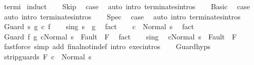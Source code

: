 \begin{isabellebody}
%
\isadelimproof
%
\endisadelimproof
%
\isatagproof
{}\isamarkupfalse%
\ termi\isanewline
{}\isamarkupfalse%
\ {\isacharparenleft}induct{\isacharparenright}\isanewline
\ \ \isamarkupfalse%
\ Skip\ \isamarkupfalse%
\ {\isacharquery}case\ \isamarkupfalse%
\ {\isacharparenleft}auto\ intro{\isacharcolon}\ terminates{\isachardot}intros{\isacharparenright}\isanewline
{}\isamarkupfalse%
\isanewline
\ \ \isamarkupfalse%
\ Basic\ \isamarkupfalse%
\ {\isacharquery}case\ \isamarkupfalse%
\ {\isacharparenleft}auto\ intro{\isacharcolon}\ terminates{\isachardot}intros{\isacharparenright}\isanewline
{}\isamarkupfalse%
\isanewline
\ \ \isamarkupfalse%
\ Spec\ \isamarkupfalse%
\ {\isacharquery}case\ \isamarkupfalse%
\ {\isacharparenleft}auto\ intro{\isacharcolon}\ terminates{\isachardot}intros{\isacharparenright}\isanewline
{}\isamarkupfalse%
\isanewline
\ \ \isamarkupfalse%
\ {\isacharparenleft}Guard\ s\ g\ c\ f{\isacharparenright}\isanewline
\ \ \isamarkupfalse%
\ s{\isacharunderscore}in{\isacharunderscore}g{\isacharcolon}\ {\isachardoublequoteopen}s\ {\isasymin}\ g{\isachardoublequoteclose}\ \isamarkupfalse%
\ fact\isanewline
\ \ \isamarkupfalse%
\ {\isachardoublequoteopen}{\isasymGamma}{\isasymturnstile}c\ {\isasymdown}\ Normal\ s{\isachardoublequoteclose}\ \isamarkupfalse%
\ fact\isanewline
\ \ \isamarkupfalse%
\ {\isachardoublequoteopen}{\isasymGamma}{\isasymturnstile}{\isasymlangle}Guard\ f\ g\ c{\isacharcomma}Normal\ s\ {\isasymrangle}\ {\isasymRightarrow}{\isasymnotin}Fault\ {\isacharbackquote}\ F{\isachardoublequoteclose}\ \isamarkupfalse%
\ fact\isanewline
\ \ \isamarkupfalse%
\ s{\isacharunderscore}in{\isacharunderscore}g\ \isamarkupfalse%
\ {\isachardoublequoteopen}{\isasymGamma}{\isasymturnstile}{\isasymlangle}c{\isacharcomma}Normal\ s\ {\isasymrangle}\ {\isasymRightarrow}{\isasymnotin}Fault\ {\isacharbackquote}\ F{\isachardoublequoteclose}\isanewline
\ \ \ \ \isamarkupfalse%
\ {\isacharparenleft}fastforce\ simp\ add{\isacharcolon}\ final{\isacharunderscore}notin{\isacharunderscore}def\ intro{\isacharcolon}\ exec{\isachardot}intros{\isacharparenright}\isanewline
\ \ \isamarkupfalse%
\ Guard{\isachardot}hyps\ \isamarkupfalse%
\ {\isachardoublequoteopen}{\isasymGamma}{\isasymturnstile}strip{\isacharunderscore}guards\ F\ c\ {\isasymdown}\ Normal\ s{\isachardoublequoteclose}\ \isamarkupfalse%

\end{isabellebody}

